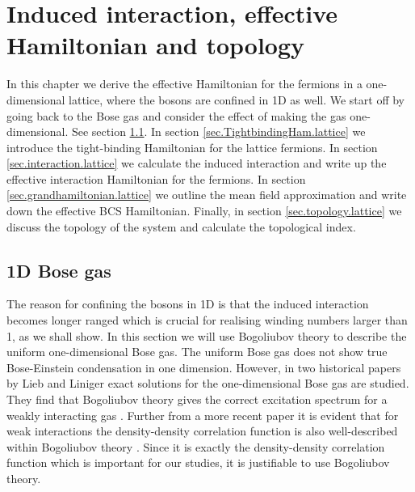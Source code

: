 \chapter{Induced interaction, effective Hamiltonian and topology} 

\label{Chapter7} 

In this chapter we derive the effective Hamiltonian for the fermions in a one-dimensional lattice, where the bosons are confined in 1D as well. We start off by going back to the Bose gas and consider the effect of making the gas one-dimensional. See section \ref{sec.1DBosegas}. In section \ref{sec.TightbindingHam.lattice} we introduce the tight-binding Hamiltonian for the lattice fermions. In section \ref{sec.interaction.lattice} we calculate the induced interaction and write up the effective interaction Hamiltonian for the fermions. In section \ref{sec.grandhamiltonian.lattice} we outline the mean field approximation and write down the effective BCS Hamiltonian. Finally, in section \ref{sec.topology.lattice} we discuss the topology of the system and calculate the topological index.

\section{1D Bose gas} \label{sec.1DBosegas}
The reason for confining the bosons in 1D is that the induced interaction becomes longer ranged which is crucial for realising winding numbers larger than 1, as we shall show. In this section we will use Bogoliubov theory to describe the uniform one-dimensional Bose gas. The uniform Bose gas does not show true Bose-Einstein condensation in one dimension. However, in two historical papers by Lieb and Liniger exact solutions for the one-dimensional Bose gas are studied. They find that Bogoliubov theory gives the correct excitation spectrum for a weakly interacting gas \cite{LiebLiniger1, LiebLiniger2}. Further from a more recent paper it is evident that for weak interactions the density-density correlation function is also well-described within Bogoliubov theory \cite{Calabrese}. Since it is exactly the density-density correlation function which is important for our studies, it is justifiable to use Bogoliubov theory.

